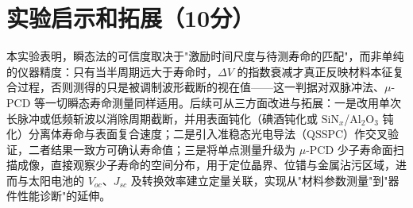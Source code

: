 \documentclass[12pt,a4paper]{ctexart}
\begin{document}
\section*{实验启示和拓展（10分）}

本实验表明，瞬态法的可信度取决于"激励时间尺度与待测寿命的匹配"，而非单纯的仪器精度：只有当半周期远大于寿命时，$\Delta V$ 的指数衰减才真正反映材料本征复合过程，否则测得的只是被调制波形截断的视在值——这一判据对双脉冲法、$\mu$-PCD 等一切瞬态寿命测量同样适用。后续可从三方面改进与拓展：一是改用单次长脉冲或低频斩波以消除周期截断，并用表面钝化（碘酒钝化或 $\mathrm{SiN}_x$/$\mathrm{Al}_2\mathrm{O}_3$ 钝化）分离体寿命与表面复合速度；二是引入准稳态光电导法（QSSPC）作交叉验证，二者结果一致方可确认寿命值；三是将单点测量升级为 $\mu$-PCD 少子寿命面扫描成像，直接观察少子寿命的空间分布，用于定位晶界、位错与金属沾污区域，进而与太阳电池的 $V_{oc}$、$J_{sc}$ 及转换效率建立定量关联，实现从"材料参数测量"到"器件性能诊断"的延伸。
\end{document}
